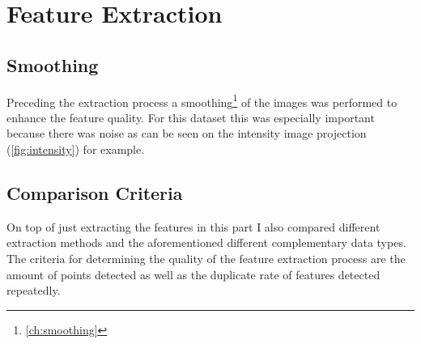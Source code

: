 \chapter{Feature Extraction}\label{ch:feature_extraction}

\section{Smoothing}{
     Preceding the extraction process a smoothing\footnote{\cref{ch:smoothing}} of the images was performed to enhance the feature quality. For this dataset this was especially important because there was noise as can be seen on the intensity image projection (\cref{fig:intensity}) for example.
}


\section{Comparison Criteria}{
    On top of just extracting the features in this part I also compared different extraction methods and the aforementioned different complementary data types. The criteria for determining the quality of the feature extraction process are the amount of points detected as well as the duplicate rate of features detected repeatedly.
}


